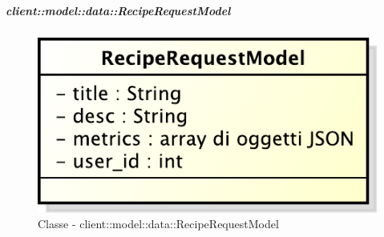 
		\subparagraph{client::model::data::RecipeRequestModel} %
		\label{subp:client_model_data_reciperequestmodel}
			\begin{figure}[htbp]
				\centering
				\centerline{\includegraphics[scale=0.7]{./images/client/classes/model/recipe_request_model.pdf}}
				\caption{Classe - client::model::data::RecipeRequestModel}
			\end{figure}
